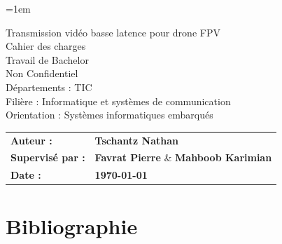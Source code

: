 \documentclass[a4paper,12pt]{article}
\begin{document}
\emergencystretch=1em 

\thispagestyle{firstpage}
\vspace*{2cm}
\begin{center}
    \Huge Transmission vidéo basse latence pour drone FPV\\
    \vspace{0.2cm}
    \Huge Cahier des charges\\
    \vspace{0.2cm}
    \Large Travail de Bachelor\\
    \vspace{0.2cm}
    \small Non Confidentiel\\
    \vspace{0.5cm}
    Départements : TIC\\
    \vspace{0.5cm}
    Filière : Informatique et systèmes de communication\\
    \vspace{0.5cm}
    Orientation : Systèmes informatiques embarqués\\
\end{center}

\vspace{9cm}

\renewcommand{\arraystretch}{1.5} %

\begin{flushleft} %
    \begin{tabular}{@{}l l@{}}
        \textbf{Auteur :}      & \textbf{Tschantz Nathan} \\
        \textbf{Supervisé par :}   & \textbf{Favrat Pierre} \& \textbf{Mahboob Karimian} \\
        \textbf{Date :}         & \textbf{\today} \\
    \end{tabular}
\end{flushleft}

\newpage

\newpage
\tableofcontents %
\newpage
\listoffigures    %
\newpage
\listoftables     %

\newpage
\pagestyle{otherpages}










\newpage
\section{Bibliographie}
\nocite{*}




%
\end{document}
